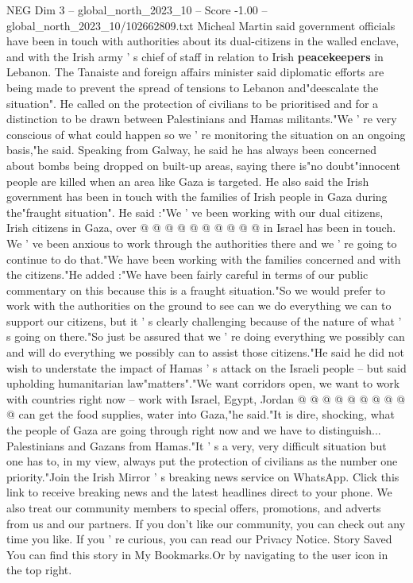 \begin{textsample}{NEG Dim 3 – global\_north\_2023\_10 – Score -1.00 – global\_north\_2023\_10/102662809.txt}  \label{ex:f3_neg_185}
Micheal Martin said government officials have been in touch with authorities about its dual-citizens in the walled enclave, and with the Irish army ' s chief of staff in relation to Irish \textbf{peacekeepers} in Lebanon.
The Tanaiste and foreign affairs minister said diplomatic efforts are being made to prevent the spread of tensions to Lebanon and"deescalate the situation".
He called on the protection of civilians to be prioritised and for a distinction to be drawn between Palestinians and Hamas militants."We ' re very conscious of what could happen so we ' re monitoring the situation on an ongoing basis,"he said.
Speaking from Galway, he said he has always been concerned about bombs being dropped on built-up areas, saying there is"no doubt"innocent people are killed when an area like Gaza is targeted.
He also said the Irish government has been in touch with the families of Irish people in Gaza during the"fraught situation".
He said :"We ' ve been working with our dual citizens, Irish citizens in Gaza, over @ @ @ @ @ @ @ @ @ @ in Israel has been in touch.
We ' ve been anxious to work through the authorities there and we ' re going to continue to do that."We have been working with the families concerned and with the citizens."He added :"We have been fairly careful in terms of our public commentary on this because this is a fraught situation."So we would prefer to work with the authorities on the ground to see can we do everything we can to support our citizens, but it ' s clearly challenging because of the nature of what ' s going on there."So just be assured that we ' re doing everything we possibly can and will do everything we possibly can to assist those citizens."He said he did not wish to understate the impact of Hamas ' s attack on the Israeli people -- but said upholding humanitarian law"matters"."We want corridors open, we want to work with countries right now -- work with Israel, Egypt, Jordan @ @ @ @ @ @ @ @ @ @ can get the food supplies, water into Gaza,"he said."It is dire, shocking, what the people of Gaza are going through right now and we have to distinguish...
Palestinians and Gazans from Hamas."It ' s a very, very difficult situation but one has to, in my view, always put the protection of civilians as the number one priority."Join the Irish Mirror ' s breaking news service on WhatsApp.
Click this link to receive breaking news and the latest headlines direct to your phone.
We also treat our community members to special offers, promotions, and adverts from us and our partners.
If you don't like our community, you can check out any time you like.
If you ' re curious, you can read our Privacy Notice.
Story Saved You can find this story in My Bookmarks.Or by navigating to the user icon in the top right.

\end{textsample}
